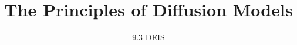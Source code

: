 ﻿%

\title{The Principles of Diffusion Models}
\subtitle{9.3 DEIS}


\begin{frame}
    \titlepage
\end{frame}


